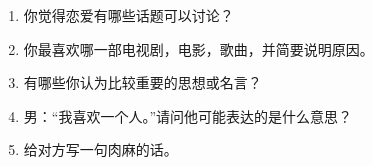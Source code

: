 \documentclass[twocolumn,landscape,UTF8]{ctexart}
\begin{document}
\begin{spacing}{1.3}
\begin{enumerate}
\item 你觉得恋爱有哪些话题可以讨论？

\item 你最喜欢哪一部电视剧，电影，歌曲，并简要说明原因。

\item 有哪些你认为比较重要的思想或名言？

\item 男：“我喜欢一个人。”请问他可能表达的是什么意思？

\item 给对方写一句肉麻的话。


\end{enumerate}
	
\end{spacing}
\clearpage
\end{document}

